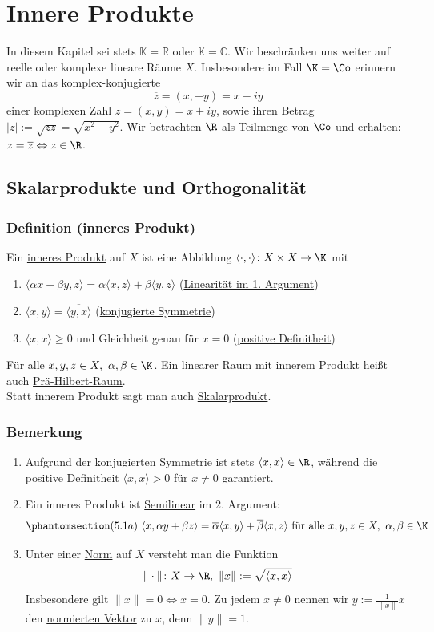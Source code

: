 \section{Innere Produkte}
In diesem Kapitel sei stets $\mathbb{K}=\mathbb{R}$ oder $\mathbb{K}=\mathbb{C}$.  Wir beschränken uns weiter auf reelle oder komplexe lineare Räume $X$.  Insbesondere im Fall $\K = \Co$ erinnern wir an das komplex-konjugierte
\[\overline{z}=(x,-y)=x-iy\]
einer komplexen Zahl $z=(x,y)=x+iy$, sowie ihren Betrag $\left|z\right|:=\sqrt{zz}=\sqrt{x^2+y^2}$.  Wir betrachten $\R$ als Teilmenge von $\Co$ und erhalten: $z=\overline{z}\Leftrightarrow z\in \R$.
\subsection{Skalarprodukte und Orthogonalität}
\subsubsection{Definition (inneres Produkt)}
Ein \underline{inneres Produkt} auf $X$ ist eine Abbildung $\langle\cdot ,\cdot \rangle\colon X\times X\rightarrow \K$ mit
\romannum
\begin{enumerate}
\item $\langle\alpha x+\beta y,z\rangle=\alpha \langle x,z\rangle+\beta \langle y,z\rangle$ (\underline{Linearität im 1. Argument})
\item $\langle x,y\rangle=\overline{\langle y,x\rangle}$ (\underline{konjugierte Symmetrie})
\item $\langle x,x\rangle\geq 0$ und Gleichheit genau für $x=0$ (\underline{positive Definitheit})
\end{enumerate}
Für alle $x,y,z\in X,\ \alpha,\beta \in \K$.  Ein linearer Raum mit innerem Produkt heißt auch \underline{Prä-Hilbert-Raum}.\\
Statt innerem Produkt sagt man auch \underline{Skalarprodukt}.
\subsubsection{Bemerkung}
\numbers
\begin{enumerate}
\item Aufgrund der konjugierten Symmetrie ist stets $\langle x,x\rangle\in \R$, während die positive Definitheit $\langle x,x\rangle>0$ für $x\not=0$ garantiert.
\item Ein inneres Produkt ist \underline{Semilinear} im 2. Argument:
\[\phantomsection\label{5.1a}(5.1a)\ \langle x,\alpha y+\beta z\rangle=\overline{\alpha }\langle x,y\rangle+\overline{\beta }\langle x,z\rangle\text{ für alle } x,y,z \in X,\ \alpha, \beta \in \K\]
\item Unter einer \underline{Norm} auf $X$ versteht man die Funktion
\[\|\cdot \|\colon X\rightarrow \R,\ \|x\| :=\sqrt{\langle x,x\rangle}\]
Insbesondere gilt $\|x\|=0\Leftrightarrow x=0$.  Zu jedem $x\not=0$ nennen wir $y:=\frac{1}{\|x\|}x$ den \underline{normierten Vektor} zu $x$, denn $\|y\|=1$.
\end{enumerate}

